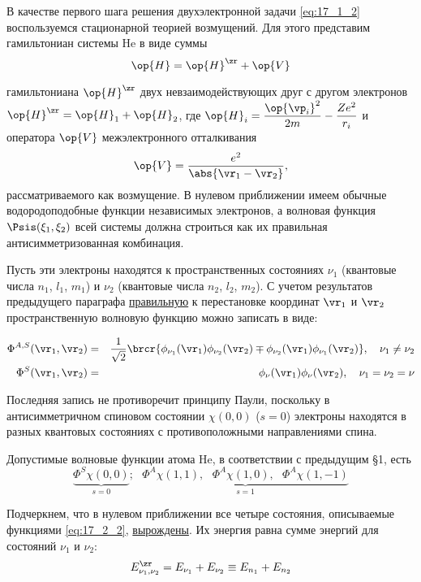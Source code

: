 В качестве первого шага решения двухэлектронной задачи \eqref{eq:17_1_2} воспользуемся стационарной теорией возмущений. Для этого представим гамильтониан системы He в виде суммы
$$
\op{H} = \op{H}^\zr + \op{V}
$$

гамильтониана $\op{H}^\zr$ двух невзаимодействующих друг с другом электронов $\op{H}^\zr = \op{H}_1 + \op{H}_2$, где $\op{H}_i = \dfrac{\op{\vp_i}^2}{2m} - \dfrac{Ze^2}{r_i}$ и оператора $\op{V}$ межэлектронного отталкивания
$$
\op{V} = \frac{e^2}{\abs{\vr_1 - \vr_2}},
$$
рассматриваемого как возмущение. В нулевом приближении имеем обычные водородоподобные функции независимых электронов, а волновая функция $\Psis(\xi_1, \xi_2)$ всей системы должна строиться как их правильная антисимметризованная комбинация.

Пусть эти электроны находятся к пространственных состояниях $\nu_1$ (квантовые числа $n_1$, $l_1$, $m_1$) и $\nu_2$ (квантовые числа $n_2$, $l_2$, $m_2$). С учетом результатов предыдущего параграфа \underline{правильную} к перестановке координат $\vr_1$ и $\vr_2$ пространственную волновую функцию можно записать в виде:



\begin{eqnarray}
\label{eq:17_2_1}
\Phi^{A, S}(\vr_1, \vr_2) &=& \frac{1}{\sqrt{2}}\brcr{\phi_{\nu_1}(\vr_1) \phi_{\nu_2}(\vr_2) \mp \phi_{\nu_2}(\vr_1) \phi_{\nu_1}(\vr_2)}, ~~~\nu_1 \neq \nu_2 \nonumber \\
\Phi^S(\vr_1, \vr_2) &=& \phi_{\nu}(\vr_1) \phi_{\nu}(\vr_2), ~~~\nu_1 = \nu_2= \nu
\end{eqnarray}

Последняя запись не противоречит принципу Паули, поскольку в антисимметричном спиновом состоянии $\chi(0, 0)$ ($s=0$) электроны находятся в разных квантовых состояниях с противоположными направлениями спина.

Допустимые волновые функции атома He, в соответствии с предыдущим \S 1, есть
\begin{equation}
\label{eq:17_2_2}
\underbrace{\Phi^S \chi(0, 0)}_{s = 0};~~~\underbrace{\Phi^A \chi(1,1),~~~\Phi^A \chi(1,0),~~~\Phi^A \chi(1,-1)}_{s = 1}
\end{equation}

Подчеркнем, что в нулевом приближении все четыре состояния, описываемые функциями \eqref{eq:17_2_2}, \underline{вырождены}. Их энергия равна сумме энергий для состояний $\nu_1$ и $\nu_2$:
$$
E_{\nu_1, \nu_2}^\zr = E_{\nu_1} + E_{\nu_2} \equiv E_{n_1} + E_{n_2}
$$

